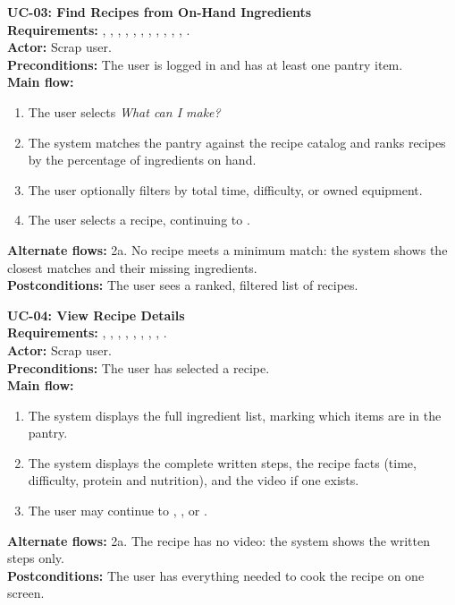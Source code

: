 \begin{sloppypar}
\medskip\noindent\textbf{UC-03: Find Recipes from On-Hand Ingredients}\\
\textbf{Requirements:} , , , , , , , , , , , .\\
\textbf{Actor:} Scrap user.\\
\textbf{Preconditions:} The user is logged in and has at least one pantry item.\\
\textbf{Main flow:}
\begin{enumerate}
\item The user selects \textit{What can I make?}
\item The system matches the pantry against the recipe catalog and ranks recipes by the percentage of ingredients on hand.
\item The user optionally filters by total time, difficulty, or owned equipment.
\item The user selects a recipe, continuing to .
\end{enumerate}
\textbf{Alternate flows:} 2a. No recipe meets a minimum match: the system shows the closest matches and their missing ingredients.\\
\textbf{Postconditions:} The user sees a ranked, filtered list of recipes.

\medskip\noindent\textbf{UC-04: View Recipe Details}\\
\textbf{Requirements:} , , , , , , , , .\\
\textbf{Actor:} Scrap user.\\
\textbf{Preconditions:} The user has selected a recipe.\\
\textbf{Main flow:}
\begin{enumerate}
\item The system displays the full ingredient list, marking which items are in the pantry.
\item The system displays the complete written steps, the recipe facts (time, difficulty, protein and nutrition), and the video if one exists.
\item The user may continue to , , or .
\end{enumerate}
\textbf{Alternate flows:} 2a. The recipe has no video: the system shows the written steps only.\\
\textbf{Postconditions:} The user has everything needed to cook the recipe on one screen.


\end{sloppypar}
